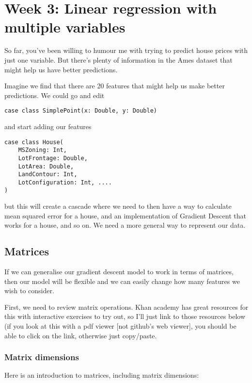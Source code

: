 \documentclass[11pt]{article}
\begin{document}
\section{Week 3: Linear regression with multiple variables}

So far, you've been willing to humour me with trying to predict house prices with just one variable. But there's plenty of information in the Ames dataset that might help us have better predictions.

Imagine we find that there are 20 features that might help us make better predictions. We could go and edit 

\begin{verbatim}
case class SimplePoint(x: Double, y: Double)
\end{verbatim}

and start adding our features

\begin{verbatim}
case class House(
	MSZoning: Int, 
	LotFrontage: Double, 
	LotArea: Double, 
	LandContour: Int, 
	LotConfiguration: Int, ....
)
\end{verbatim}

but this will create a cascade where we need to then have a way to calculate mean squared error for a house, and an implementation of Gradient Descent that works for a house, and so on. We need a more general way to represent our data. 

\subsection{Matrices}

If we can generalise our gradient descent model to work in terms of matrices, then our model will be flexible and we can easily change how many features we wish to consider. 

First, we need to review matrix operations. Khan academy has great resources for this with interactive exercises to try out, so I'll just link to those resources below (if you look at this with a pdf viewer [not github's web viewer], you should be able to click on the link, otherwise just copy/paste. 


\subsubsection{Matrix dimensions} 

Here is an introduction to matrices, including matrix dimensions: \\
\end{document}
